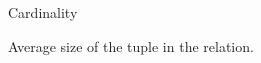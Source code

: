 \documentclass{vldb}
\newcommand{\ii}{\item}
\begin{document}
\ii Cardinality
\ii Average size of the tuple in the relation.
\end{document}
